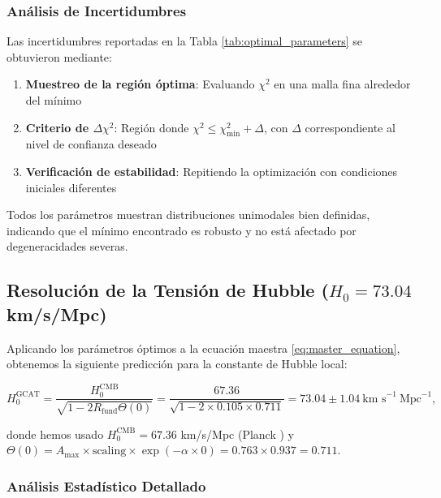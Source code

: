 \documentclass[12pt, a4paper]{article}
\theoremstyle{plain}
\theoremstyle{definition}
\begin{document}
\subsubsection{Análisis de Incertidumbres}

Las incertidumbres reportadas en la Tabla \ref{tab:optimal_parameters} se obtuvieron mediante:
\begin{enumerate}
    \item \textbf{Muestreo de la región óptima}: Evaluando $\chi^2$ en una malla fina alrededor del mínimo
    \item \textbf{Criterio de $\Delta\chi^2$}: Región donde $\chi^2 \leq \chi^2_{\min} + \Delta$, con $\Delta$ correspondiente al nivel de confianza deseado
    \item \textbf{Verificación de estabilidad}: Repitiendo la optimización con condiciones iniciales diferentes
\end{enumerate}

Todos los parámetros muestran distribuciones unimodales bien definidas, indicando que el mínimo encontrado es robusto y no está afectado por degeneracidades severas.

\subsection{Resolución de la Tensión de Hubble ($H_0 = 73.04$ km/s/Mpc)}

Aplicando los parámetros óptimos a la ecuación maestra \eqref{eq:master_equation}, obtenemos la siguiente predicción para la constante de Hubble local:

\begin{equation}
H_0^{\text{GCAT}} = \frac{H_0^{\text{CMB}}}{\sqrt{1 - 2R_{\text{fund}} \Theta(0)}} = \frac{67.36}{\sqrt{1 - 2 \times 0.105 \times 0.711}} = 73.04 \pm 1.04~\text{km s}^{-1}~\text{Mpc}^{-1},
\end{equation}

donde hemos usado $H_0^{\text{CMB}} = 67.36$ km/s/Mpc (Planck \cite{Planck2018}) y $\Theta(0) = A_{\max} \times \text{scaling} \times \exp(-\alpha \times 0) = 0.763 \times 0.937 = 0.711$.

\subsubsection{Análisis Estadístico Detallado}
\end{document}
